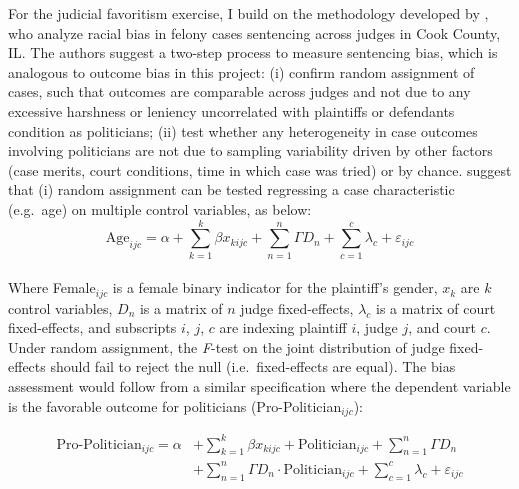 \documentclass[11pt]{article}
\begin{document}
For the judicial favoritism exercise, I build on the methodology developed by \citet{AbramsJudgesVaryTheir2012}, who analyze racial bias in felony cases sentencing across judges in Cook County, IL. The authors suggest a two-step process to measure sentencing bias, which is analogous to outcome bias in this project: (i) confirm random assignment of cases, such that outcomes are comparable across judges and not due to any excessive harshness or leniency uncorrelated with plaintiffs or defendants condition as politicians; (ii) test whether any heterogeneity in case outcomes involving politicians are not due to sampling variability driven by other factors (case merits, court conditions, time in which case was tried) or by chance. \citet{AbramsJudgesVaryTheir2012} suggest that (i) random assignment can be tested regressing a case characteristic (e.g.~age) on multiple control variables, as below: \\

\begin{equation} \label{eq:methods1}
  \text{Age}_{ijc} = \alpha + \sum_{k=1}^{k} \beta x_{kijc} + \sum_{n=1}^{n} \Gamma D_{n} + \sum_{c = 1}^{c} \lambda_{c} + \varepsilon_{ijc}
\end{equation} \\

Where Female$_{ijc}$ is a female binary indicator for the plaintiff's gender, $x_{k}$ are $k$ control variables, $D_{n}$ is a matrix of $n$ judge fixed-effects, $\lambda_{c}$ is a matrix of court fixed-effects, and subscripts $i$, $j$, $c$ are indexing plaintiff $i$, judge $j$, and court $c$. Under random assignment, the \emph{F}-test on the joint distribution of judge fixed-effects should fail to reject the null (i.e.~fixed-effects are equal). The bias assessment would follow from a similar specification where the dependent variable is the favorable outcome for politicians (Pro-Politician$_{ijc}$):

\begin{equation}
  \begin{split} \label{eq:methods2}
    \text{Pro-Politician}_{ijc} = \alpha & + \sum_{k=1}^{k} \beta x_{kijc} + \text{Politician}_{ijc} + \sum_{n=1}^{n} \Gamma D_{n} \\
    & + \sum_{n=1}^{n} \Gamma D_{n} \cdot \text{Politician}_{ijc} + \sum_{c=1}^{c} \lambda_{c} + \varepsilon_{ijc}
  \end{split}
\end{equation} \\
\end{document}
